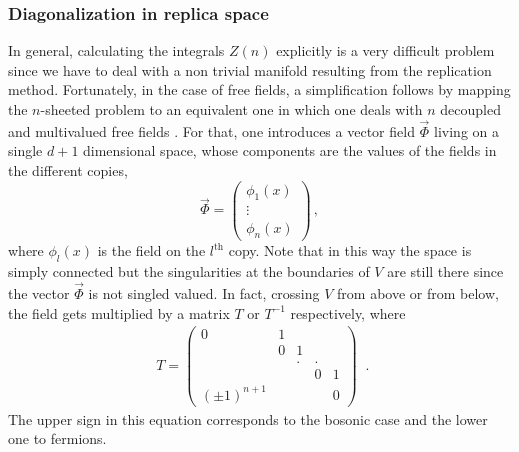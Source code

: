 \documentclass[11pt]{article}
\begin{document}
\subsubsection{Diagonalization in replica space}
In general, calculating the integrals $Z(n)$ explicitly is a very difficult problem since we have to deal with a non trivial manifold resulting from the replication method.
Fortunately, in the case of free fields, a simplification  follows by mapping the $n$-sheeted problem to an equivalent one in which one deals with $n$ decoupled and multivalued free fields  \cite{fermion}. For that, one introduces a vector field $\vec{\Phi}$ living on a single $d+1$ dimensional space, whose components are the values of the fields in the different copies, 
\begin{equation}
\vec{\Phi}=\left(\begin{array}{c}
\phi _{1}(x)\\
\vdots \\  
\phi _{n}(x) \end{array}
\right) \,,
\end{equation}
where $\phi _{l}(x)$ is the field on the $l^{\textrm{th}}$ copy. 
Note that in this way the space is simply connected but the singularities at the boundaries of $V$ are still there since the vector $\vec{\Phi}$ is not singled valued.  In fact, crossing $V$ from above or from below, the field gets multiplied by a matrix $T$ or $T^{-1}$ respectively, where
\begin{equation}
\begin{array}{c}
T=\left(
\begin{array}{lllll}
0 & 1 &  &  &  \\
& 0 & 1 &  &  \\
&  & . & . &  \\
&  &  & 0 & 1 \\
(\pm1)^{n+1} &  &  &  & 0
\end{array}
\right)
\end{array}\,. 
\end{equation}
The upper sign in this equation corresponds to the bosonic case and the lower one to fermions. 
\end{document}
